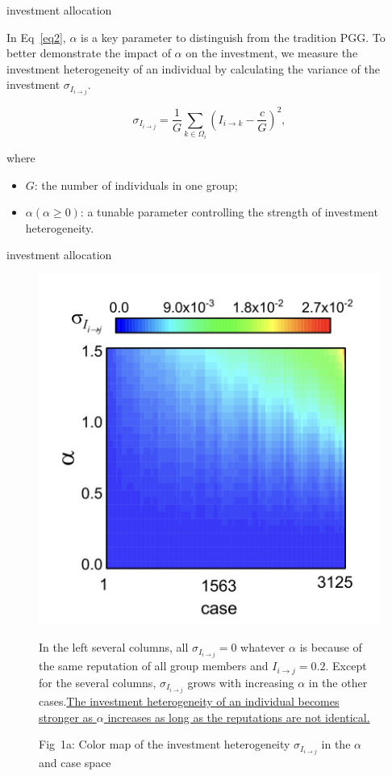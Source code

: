 \documentclass[notheorems,11pt,compress]{beamer}
\numberwithin{figure}{section}
\numberwithin{table}{section}
\numberwithin{equation}{section}
\theoremstyle{plain}
\numberwithin{theorem}{section}
\numberwithin{definition}{section}
\numberwithin{lemma}{section}
\numberwithin{proposition}{section}
\numberwithin{corollary}{section}
\theoremstyle{example}
\begin{document}
\begin{frame}{investment allocation}

	In Eq~\ref{eq2}, $\alpha $ is a key parameter to distinguish from the tradition PGG.
	To better demonstrate the impact of $\alpha $ on the investment, we measure the investment heterogeneity of an individual by calculating the variance of the investment $\sigma_{I_{i\to j}}$.

	\begin{equation}\label{eq3}
		\sigma_{I_{i \rightarrow j}}=\frac{1}{G} \sum_{k \in \Omega_i}\left(I_{i \rightarrow k}-\frac{c}{G}\right)^2,
	\end{equation}

	where

	\begin{itemize}
		\item $G$: the number of individuals in one group;
		\item $\alpha(\alpha\geq0)$: a tunable parameter controlling the strength of investment heterogeneity.
	\end{itemize}
\end{frame}


\begin{frame}{investment allocation}

	\begin{figure}[H]
		\centering
		\includegraphics[width=0.5\linewidth]{1a}
		\quad
		\parbox[b]{.45\textwidth}{
			In the left several columns, all $\sigma_{I_{i \rightarrow j}}=0$ whatever $\alpha$ is because of the same reputation of all group members and $I_{i\to j} = 0.2$. Except for the several columns, $\sigma_{I_{i \rightarrow j}}$ grows with increasing $\alpha$ in the other cases.\uline{The investment heterogeneity of an individual becomes stronger as $\alpha$ increases as long as the reputations are not identical. }}
		\parbox{.75\textwidth}{\vspace*{1ex}Fig\ 1a: Color map of the investment heterogeneity $\sigma_{I_{i \rightarrow j}}$ in the $\alpha$ and case space}
		\label{fig1a}
	\end{figure}
\end{frame}
\end{document}
